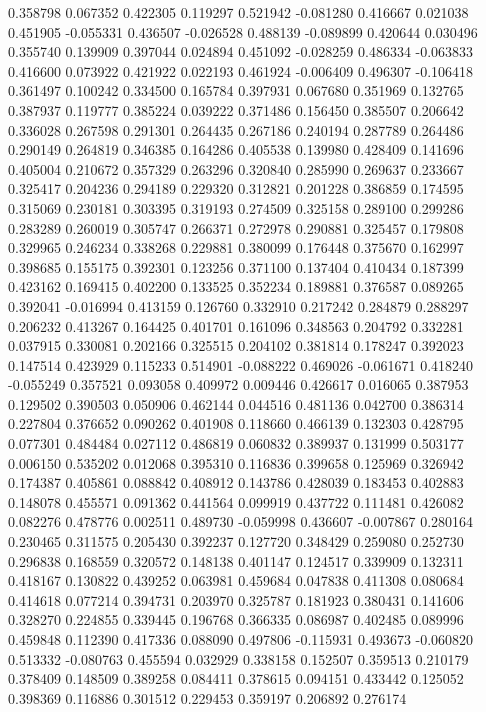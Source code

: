 0.358798
0.067352
0.422305
0.119297
0.521942
-0.081280
0.416667
0.021038
0.451905
-0.055331
0.436507
-0.026528
0.488139
-0.089899
0.420644
0.030496
0.355740
0.139909
0.397044
0.024894
0.451092
-0.028259
0.486334
-0.063833
0.416600
0.073922
0.421922
0.022193
0.461924
-0.006409
0.496307
-0.106418
0.361497
0.100242
0.334500
0.165784
0.397931
0.067680
0.351969
0.132765
0.387937
0.119777
0.385224
0.039222
0.371486
0.156450
0.385507
0.206642
0.336028
0.267598
0.291301
0.264435
0.267186
0.240194
0.287789
0.264486
0.290149
0.264819
0.346385
0.164286
0.405538
0.139980
0.428409
0.141696
0.405004
0.210672
0.357329
0.263296
0.320840
0.285990
0.269637
0.233667
0.325417
0.204236
0.294189
0.229320
0.312821
0.201228
0.386859
0.174595
0.315069
0.230181
0.303395
0.319193
0.274509
0.325158
0.289100
0.299286
0.283289
0.260019
0.305747
0.266371
0.272978
0.290881
0.325457
0.179808
0.329965
0.246234
0.338268
0.229881
0.380099
0.176448
0.375670
0.162997
0.398685
0.155175
0.392301
0.123256
0.371100
0.137404
0.410434
0.187399
0.423162
0.169415
0.402200
0.133525
0.352234
0.189881
0.376587
0.089265
0.392041
-0.016994
0.413159
0.126760
0.332910
0.217242
0.284879
0.288297
0.206232
0.413267
0.164425
0.401701
0.161096
0.348563
0.204792
0.332281
0.037915
0.330081
0.202166
0.325515
0.204102
0.381814
0.178247
0.392023
0.147514
0.423929
0.115233
0.514901
-0.088222
0.469026
-0.061671
0.418240
-0.055249
0.357521
0.093058
0.409972
0.009446
0.426617
0.016065
0.387953
0.129502
0.390503
0.050906
0.462144
0.044516
0.481136
0.042700
0.386314
0.227804
0.376652
0.090262
0.401908
0.118660
0.466139
0.132303
0.428795
0.077301
0.484484
0.027112
0.486819
0.060832
0.389937
0.131999
0.503177
0.006150
0.535202
0.012068
0.395310
0.116836
0.399658
0.125969
0.326942
0.174387
0.405861
0.088842
0.408912
0.143786
0.428039
0.183453
0.402883
0.148078
0.455571
0.091362
0.441564
0.099919
0.437722
0.111481
0.426082
0.082276
0.478776
0.002511
0.489730
-0.059998
0.436607
-0.007867
0.280164
0.230465
0.311575
0.205430
0.392237
0.127720
0.348429
0.259080
0.252730
0.296838
0.168559
0.320572
0.148138
0.401147
0.124517
0.339909
0.132311
0.418167
0.130822
0.439252
0.063981
0.459684
0.047838
0.411308
0.080684
0.414618
0.077214
0.394731
0.203970
0.325787
0.181923
0.380431
0.141606
0.328270
0.224855
0.339445
0.196768
0.366335
0.086987
0.402485
0.089996
0.459848
0.112390
0.417336
0.088090
0.497806
-0.115931
0.493673
-0.060820
0.513332
-0.080763
0.455594
0.032929
0.338158
0.152507
0.359513
0.210179
0.378409
0.148509
0.389258
0.084411
0.378615
0.094151
0.433442
0.125052
0.398369
0.116886
0.301512
0.229453
0.359197
0.206892
0.276174
